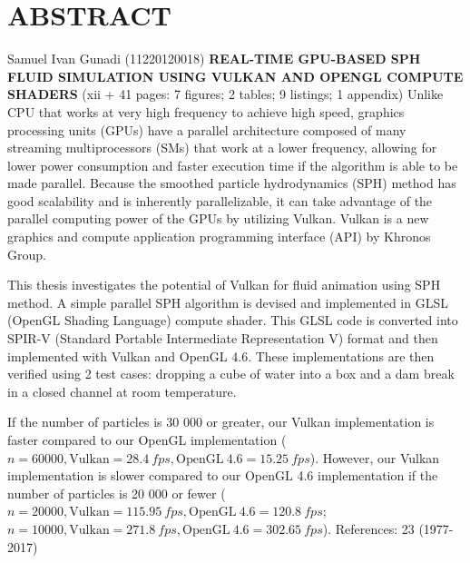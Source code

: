 \documentclass[a4paper, 12pt, oneside]{book}
\begin{document}
\chapter{ABSTRACT}

\begin{singlespace}
    Samuel Ivan Gunadi (11220120018)
    \newline
    {\bfseries\large\centering\MakeTextUppercase{Real-Time GPU-Based SPH Fluid Simulation Using Vulkan and OpenGL Compute Shaders}}
    \newline
    (xii + 41 pages: 7 figures; 2 tables; 9 listings; 1 appendix)
    \vspace{1\baselineskip}
    \newline
    Unlike CPU that works at very high frequency to achieve high speed, graphics processing units (GPUs) have a parallel architecture composed of many streaming multiprocessors (SMs) that work at a lower frequency, allowing for lower power consumption and faster execution time if the algorithm is able to be made parallel. Because the smoothed particle hydrodynamics (SPH) method has good scalability and is inherently parallelizable, it can take advantage of the parallel computing power of the GPUs by utilizing Vulkan. Vulkan is a new graphics and compute application programming interface (API) by Khronos Group.

    This thesis investigates the potential of Vulkan for fluid animation using SPH method. A simple parallel SPH algorithm is devised and implemented in GLSL (OpenGL Shading Language) compute shader. This GLSL code is converted into SPIR-V (Standard Portable Intermediate Representation V) format and then implemented with Vulkan and OpenGL 4.6. These implementations are then verified using 2 test cases: dropping a cube of water into a box and a dam break in a closed channel at room temperature.
    
    If the number of particles is 30 000 or greater, our Vulkan implementation is faster compared to our OpenGL implementation (\(n = 60 000, \mathrm{Vulkan} = \SI{28.4}{fps}, \mathrm{OpenGL\ 4.6} = \SI{15.25}{fps}\)). However, our Vulkan implementation is slower compared to our OpenGL 4.6 implementation if the number of particles is 20 000 or fewer (\(n = 20000, \mathrm{Vulkan} = \SI{115.95}{fps}, \mathrm{OpenGL\ 4.6} = \SI{120.8}{fps}\); \(n = 10000, \mathrm{Vulkan} = \SI{271.8}{fps}, \mathrm{OpenGL\ 4.6} = \SI{302.65}{fps}\)).
    \vspace{1\baselineskip}
    \newline
    References: 23 (1977-2017)
\end{singlespace}
\end{document}
